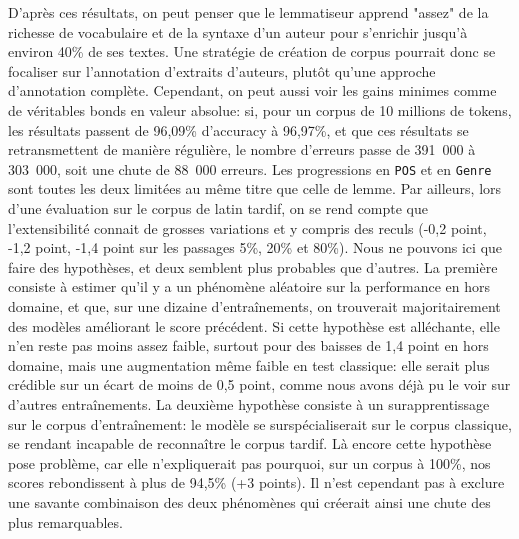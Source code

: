 D'après ces résultats, on peut penser que le lemmatiseur apprend "assez" de la richesse de vocabulaire et de la syntaxe d'un auteur pour s'enrichir jusqu'à environ 40\% de ses textes. Une stratégie de création de corpus pourrait donc se focaliser sur l'annotation d'extraits d'auteurs, plutôt qu'une approche d'annotation complète. Cependant, on peut aussi voir les gains minimes comme de véritables bonds en valeur absolue: si, pour un corpus de 10 millions de tokens, les résultats passent de 96,09\% d'accuracy à 96,97\%, et que ces résultats se retransmettent de manière régulière, le nombre d'erreurs passe de 391~000 à 303~000, soit une chute de 88~000 erreurs. Les progressions en \texttt{POS} et en \texttt{Genre} sont toutes les deux limitées au même titre que celle de lemme. Par ailleurs, lors d'une évaluation sur le corpus de latin tardif, on se rend compte que l'extensibilité connait de grosses variations et y compris des reculs (-0,2 point, -1,2 point, -1,4 point sur les passages 5\%, 20\% et 80\%). Nous ne pouvons ici que faire des hypothèses, et deux semblent plus probables que d'autres. La première consiste à estimer qu'il y a un phénomène aléatoire sur la performance en hors domaine, et que, sur une dizaine d'entraînements, on trouverait majoritairement des modèles améliorant le score précédent. Si cette hypothèse est alléchante, elle n'en reste pas moins assez faible, surtout pour des baisses de 1,4 point en hors domaine, mais une augmentation même faible en test classique: elle serait plus crédible sur un écart de moins de 0,5 point, comme nous avons déjà pu le voir sur d'autres entraînements. La deuxième hypothèse consiste à un surapprentissage sur le corpus d'entraînement: le modèle se surspécialiserait sur le corpus classique, se rendant incapable de reconnaître le corpus tardif. Là encore cette hypothèse pose problème, car elle n'expliquerait pas pourquoi, sur un corpus à 100\%, nos scores rebondissent à plus de 94,5\% (+3 points). Il n'est cependant pas à exclure une savante combinaison des deux phénomènes qui créerait ainsi une chute des plus remarquables.



